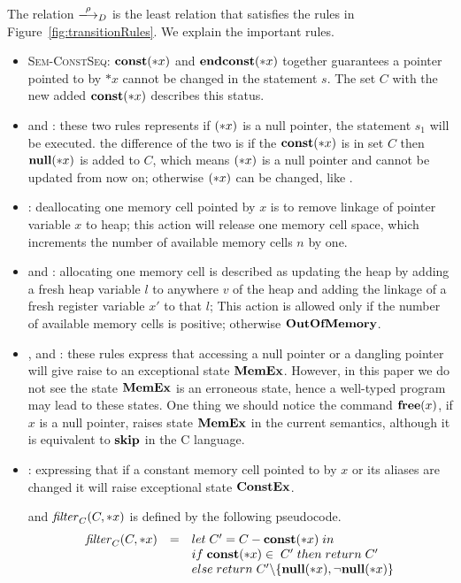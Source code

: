 The relation $\xlongrightarrow{\rho}_D$ is the least relation that
satisfies the rules in Figure~\ref{fig:transitionRules}.  We explain the
important rules.
\begin{itemize}
\item \textsc{Sem-ConstSeq}: \(\mathbf{const}(*x)\) and \(\mathbf{endconst}(*x)\) together
  guarantees a pointer pointed to by \(*x\) cannot be changed in the
  statement \(s\). The set \(C\) with the new added \(\mathbf{const}(*x)\)
  describes this status.

\item {} and : these two rules
  represents if \((*x)\) is a null pointer, the statement \(s_1\)
  will be executed. the difference of the two is if the \(\mathbf{const}(*x)\)
  is in set \(C\) then\(\mathbf{null}(*x)\) is added to \(C\), which means
  \((*x)\) is a null pointer and cannot be updated from now on;
  otherwise \((*x)\) can be changed, like .

\item {}: deallocating one memory cell pointed by \(x\) is
  to remove linkage of pointer variable \(x\) to heap; this action
  will release one memory cell space, which increments the number of
  available memory cells \(n\) by one. 

\item {} and : allocating one memory
  cell is described as updating the heap by adding a fresh heap
  variable \(l\) to anywhere \(v\) of the heap and adding the linkage
  of a fresh register variable \(x'\) to that \(l\); This action is
  allowed only if the number of available memory cells is positive;
  otherwise \(\mathbf{OutOfMemory}\).
  
\item {},  and : these
  rules express that accessing a null pointer or a dangling pointer
  will give raise to an exceptional state \(\mathbf{MemEx}\).  However, in
  this paper we do not see the state \(\mathbf{MemEx}\) is an erroneous state,
  hence a well-typed program may lead to these states. One thing we
  should notice the command \(\mathbf{free}(x)\), if \(x\) is a null pointer,
  raises state \(\mathbf{MemEx}\) in the current semantics, although it is
  equivalent to \(\mathbf{skip}\) in the C language.
  
\item {}: expressing that if a constant memory
  cell pointed to by \(x\) or its aliases are changed it will raise
  exceptional state \(\mathbf{ConstEx}\).



and \(\mathit{filter}_C(C, *x)\) is defined by the following pseudocode.
\[
\begin{array}{lcl}
  \mathit{filter}_C(C, *x) &=& let \; C' = C - \mathbf{const}(*x) \; in \\
  & & if \; \mathbf{const}(*x) \in \; C'\; then \; return \; C'\\
  & & else \; return \; C'\backslash\{\mathbf{null}(*x),\neg\mathbf{null}(*x) \}
\end{array}
\]

\end{itemize}

